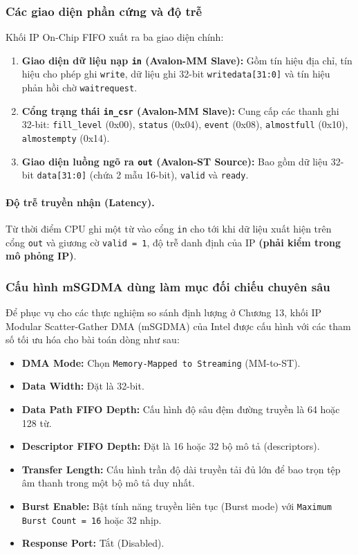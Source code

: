 \subsubsection*{Các giao diện phần cứng và độ trễ}
Khối IP On-Chip FIFO xuất ra ba giao diện chính:
\begin{enumerate}[leftmargin=1.5em, itemsep=3pt]
    \item \textbf{Giao diện dữ liệu nạp \texttt{in} (Avalon-MM Slave):} Gồm tín hiệu địa chỉ, tín hiệu cho phép ghi \texttt{write}, dữ liệu ghi 32-bit \texttt{writedata[31:0]} và tín hiệu phản hồi chờ \texttt{waitrequest}.
    \item \textbf{Cổng trạng thái \texttt{in\_csr} (Avalon-MM Slave):} Cung cấp các thanh ghi 32-bit: \texttt{fill\_level} (0x00), \texttt{status} (0x04), \texttt{event} (0x08), \texttt{almostfull} (0x10), \texttt{almostempty} (0x14).
    \item \textbf{Giao diện luồng ngõ ra \texttt{out} (Avalon-ST Source):} Bao gồm dữ liệu 32-bit \texttt{data[31:0]} (chứa 2 mẫu 16-bit), \texttt{valid} và \texttt{ready}.
\end{enumerate}

\paragraph{Độ trễ truyền nhận (Latency).}
Từ thời điểm CPU ghi một từ vào cổng \texttt{in} cho tới khi dữ liệu xuất hiện trên cổng \texttt{out} và giương cờ \texttt{valid = 1}, độ trễ danh định của IP \textbf{(phải kiểm trong mô phỏng IP)}.

\subsubsection*{Cấu hình mSGDMA dùng làm mục đối chiếu chuyên sâu}
Để phục vụ cho các thực nghiệm so sánh định lượng ở Chương 13, khối IP Modular Scatter-Gather DMA (mSGDMA) của Intel được cấu hình với các tham số tối ưu hóa cho bài toán dòng như sau:
\begin{itemize}[leftmargin=1.5em, itemsep=2pt]
    \item \textbf{DMA Mode:} Chọn \texttt{Memory-Mapped to Streaming} (MM-to-ST).
    \item \textbf{Data Width:} Đặt là 32-bit.
    \item \textbf{Data Path FIFO Depth:} Cấu hình độ sâu đệm đường truyền là 64 hoặc 128 từ.
    \item \textbf{Descriptor FIFO Depth:} Đặt là 16 hoặc 32 bộ mô tả (descriptors).
    \item \textbf{Transfer Length:} Cấu hình trần độ dài truyền tải đủ lớn để bao trọn tệp âm thanh trong một bộ mô tả duy nhất.
    \item \textbf{Burst Enable:} Bật tính năng truyền liên tục (Burst mode) với \texttt{Maximum Burst Count = 16} hoặc 32 nhịp.
    \item \textbf{Response Port:} Tắt (Disabled).
\end{itemize}

